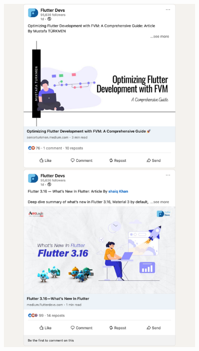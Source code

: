 \Continuing
\begin{center}
    \includegraphics[width=28em]{flutter-devs-posts-p2}
\end{center}
\WillContinue
\pagebreak

